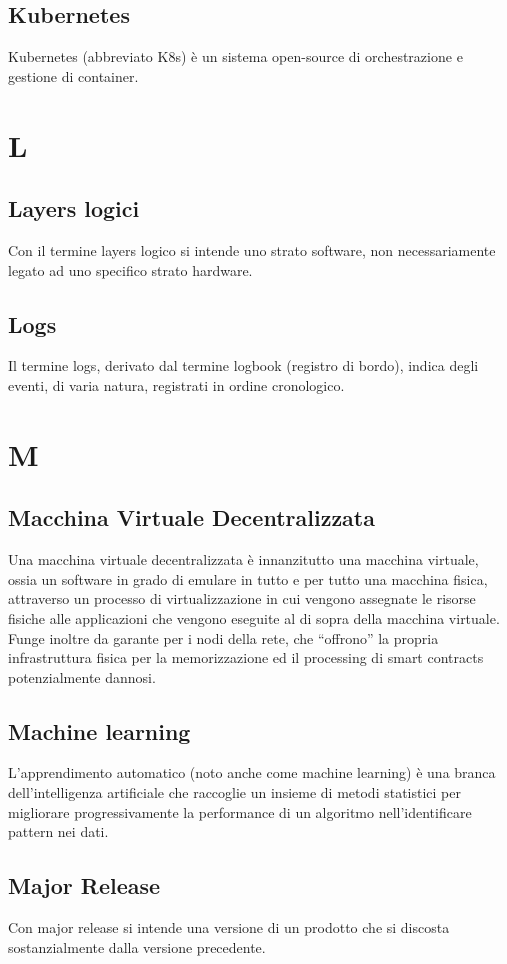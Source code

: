 \subsection{Kubernetes}  Kubernetes (abbreviato K8s) è un sistema open-source di orchestrazione e gestione di container.

\newpage \section{L}
\subsection{Layers logici}  Con il termine layers logico si intende uno strato software, non necessariamente legato ad uno specifico strato hardware.
\subsection{Logs}  Il termine logs, derivato dal termine logbook (registro di bordo), indica degli eventi, di varia natura, registrati in ordine cronologico.


\newpage \section{M}
\subsection{Macchina Virtuale Decentralizzata}  Una macchina virtuale decentralizzata è innanzitutto una macchina virtuale, ossia un software in grado di emulare in tutto e per tutto una macchina fisica, attraverso un processo di virtualizzazione in cui vengono assegnate le risorse fisiche alle applicazioni che vengono eseguite al di sopra della macchina virtuale. Funge inoltre da garante per i nodi della rete, che “offrono” la propria infrastruttura fisica per la memorizzazione ed il processing di smart contracts potenzialmente dannosi.
\subsection{Machine learning}  L’apprendimento automatico (noto anche come machine learning) è una branca dell'intelligenza artificiale che raccoglie un insieme di metodi statistici per migliorare progressivamente la performance di un algoritmo nell'identificare pattern nei dati. 
\subsection{Major Release}  Con major release si intende una versione di un prodotto che si discosta sostanzialmente dalla versione precedente.
